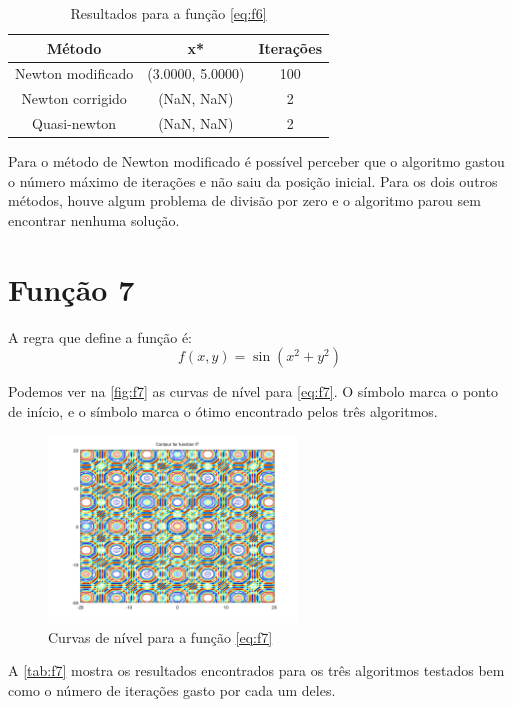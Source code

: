\documentclass[12pt]{article}
\begin{document}
\begin{table}[H]
\centering
\begin{tabular}{*3c}
\toprule
Método			&	x*		&	Iterações\\
\midrule
Newton modificado	&	(3.0000, 5.0000)	&	100\\
Newton corrigido	&	(NaN, NaN)		&	2\\
Quasi-newton		&	(NaN, NaN)		&	2\\
\bottomrule
\end{tabular}
\caption{\small{Resultados para a função \autoref{eq:f6} }}
\label{tab:f6}
\end{table}

Para o método de Newton modificado é possível perceber que o algoritmo gastou o número máximo de iterações e não saiu da posição inicial.
Para os dois outros métodos, houve algum problema de divisão por zero e o algoritmo parou sem encontrar nenhuma solução.

\section{Função 7}
A regra que define a função é:
\begin{equation}
\label{eq:f7}
f(x, y) = \sin(x^2 + y^2)
\end{equation}

Podemos ver na \autoref{fig:f7} as curvas de nível para \autoref{eq:f7}. O símbolo \textit{\textopenbullet} marca o ponto de início,
e o símbolo \textit{\texttimes} marca o ótimo encontrado pelos três algoritmos.

\begin{figure}[H]
  \centering
  \includegraphics[width=250px]{../matlab/images/f7_contour}
  \caption{Curvas de nível para a função \autoref{eq:f7}}
  \label{fig:f7}
\end{figure}

A \autoref{tab:f7} mostra os resultados encontrados para os três algoritmos testados bem como o número de iterações gasto por cada um deles.
\end{document}

